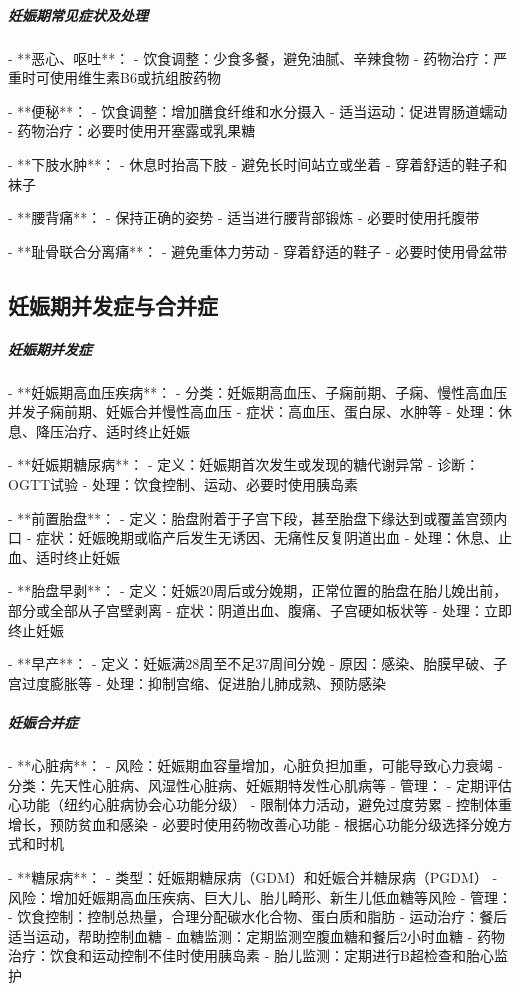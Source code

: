 \begin{enumerate}
\subparagraph{妊娠期常见症状及处理}

- **恶心、呕吐**：
  - 饮食调整：少食多餐，避免油腻、辛辣食物
  - 药物治疗：严重时可使用维生素B6或抗组胺药物

- **便秘**：
  - 饮食调整：增加膳食纤维和水分摄入
  - 适当运动：促进胃肠道蠕动
  - 药物治疗：必要时使用开塞露或乳果糖

- **下肢水肿**：
  - 休息时抬高下肢
  - 避免长时间站立或坐着
  - 穿着舒适的鞋子和袜子

- **腰背痛**：
  - 保持正确的姿势
  - 适当进行腰背部锻炼
  - 必要时使用托腹带

- **耻骨联合分离痛**：
  - 避免重体力劳动
  - 穿着舒适的鞋子
  - 必要时使用骨盆带

\subsection{妊娠期并发症与合并症}

\subparagraph{妊娠期并发症}

- **妊娠期高血压疾病**：
  - 分类：妊娠期高血压、子痫前期、子痫、慢性高血压并发子痫前期、妊娠合并慢性高血压
  - 症状：高血压、蛋白尿、水肿等
  - 处理：休息、降压治疗、适时终止妊娠

- **妊娠期糖尿病**：
  - 定义：妊娠期首次发生或发现的糖代谢异常
  - 诊断：OGTT试验
  - 处理：饮食控制、运动、必要时使用胰岛素

- **前置胎盘**：
  - 定义：胎盘附着于子宫下段，甚至胎盘下缘达到或覆盖宫颈内口
  - 症状：妊娠晚期或临产后发生无诱因、无痛性反复阴道出血
  - 处理：休息、止血、适时终止妊娠

- **胎盘早剥**：
  - 定义：妊娠20周后或分娩期，正常位置的胎盘在胎儿娩出前，部分或全部从子宫壁剥离
  - 症状：阴道出血、腹痛、子宫硬如板状等
  - 处理：立即终止妊娠

- **早产**：
  - 定义：妊娠满28周至不足37周间分娩
  - 原因：感染、胎膜早破、子宫过度膨胀等
  - 处理：抑制宫缩、促进胎儿肺成熟、预防感染

\subparagraph{妊娠合并症}

- **心脏病**：
  - 风险：妊娠期血容量增加，心脏负担加重，可能导致心力衰竭
  - 分类：先天性心脏病、风湿性心脏病、妊娠期特发性心肌病等
  - 管理：
    - 定期评估心功能（纽约心脏病协会心功能分级）
    - 限制体力活动，避免过度劳累
    - 控制体重增长，预防贫血和感染
    - 必要时使用药物改善心功能
    - 根据心功能分级选择分娩方式和时机

- **糖尿病**：
  - 类型：妊娠期糖尿病（GDM）和妊娠合并糖尿病（PGDM）
  - 风险：增加妊娠期高血压疾病、巨大儿、胎儿畸形、新生儿低血糖等风险
  - 管理：
    - 饮食控制：控制总热量，合理分配碳水化合物、蛋白质和脂肪
    - 运动治疗：餐后适当运动，帮助控制血糖
    - 血糖监测：定期监测空腹血糖和餐后2小时血糖
    - 药物治疗：饮食和运动控制不佳时使用胰岛素
    - 胎儿监测：定期进行B超检查和胎心监护


\end{enumerate}
